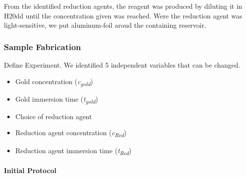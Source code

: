 From the identified reduction agents, the reagent was produced by diluting it in H20dd until the concentration given was reached. Were the reduction agent was light-sensitive, we put aluminum-foil aroud the containing reservoir.

\subsubsection{Sample Fabrication}

Define Experiment. We identified 5 independent variables that can be changed.


\begin{multicols}{2}
\begin{itemize}
    \item Gold concentration (\textit{c\textsubscript{gold}})
    \item Gold immersion time (\textit{t\textsubscript{gold}})
    \item Choice of reduction agent
    \item Reduction agent concentration (\textit{c\textsubscript{Red}})
    \item Reduction agent immersion time (\textit{t\textsubscript{Red}})
\end{itemize}
\end{multicols}




\paragraph{Initial Protocol}

